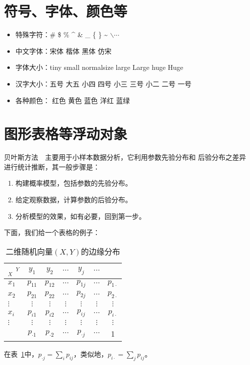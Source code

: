 \documentclass[a4paper,11pt,         %
               twoside,              %
               ]{article}
\begin{document}
\section{符号、字体、颜色等}
\begin{itemize}
  \item 特殊字符：\# \$ \% \^{} \& \_ \{ \} \~{} $\backslash \cdots$
  \item 中文字体：{\song 宋体} {\kai 楷体} {\hei 黑体} {\fs 仿宋}
  \item 字体大小：{\tiny tiny} {\small small} {\normalsize normalsize}
                  {\large large} {\Large Large} {\huge huge} {\Huge Huge}
  \item 汉字大小：{\wuhao 五号} {\dawu 大五} {\xiaosi 小四} {\sihao 四号}
                  {\xiaosan 小三} {\sanhao 三号} {\xiaoer 小二} {\erhao 二号} {\yihao 一号}
  \item 各种颜色：{\color{red} 红色} {\color{yellow} 黄色} {\color{blue} 蓝色}
                  {\color{magenta} 洋红} {\color{cyan} 蓝绿}
\end{itemize}
\section{图形表格等浮动对象}

贝叶斯方法~\cite{Gelman}~主要用于小样本数据分析，它利用参数先验分布和
后验分布之差异进行统计推断，其一般步骤是：
\begin{enumerate}
  \item 构建概率模型，包括参数的先验分布。
  \item 给定观察数据，计算参数的后验分布。
  \item 分析模型的效果，如有必要，回到第一步。
\end{enumerate}
下面，我们给一个表格的例子：
\begin{center}
\begin{table}[!h]     %
\centering
\caption{二维随机向量$(X,Y)$的边缘分布}
\begin{tabular}{l|ccccc|c}
  $_X$\hspace{3mm} $^Y$&$y_1$&$y_2$&$\cdots$&$y_j$&$\cdots$\\
\hline
$x_1$   &$p_{11}$&$p_{12}$&$\cdots$&$p_{1j}$&$\cdots$&$p_{1\cdot}$\\
$x_2$   &$p_{21}$&$p_{22}$&$\cdots$&$p_{2j}$&$\cdots$&$p_{2\cdot}$\\
$\vdots$&$\vdots$&$\vdots$&$\vdots$&$\vdots$&$\vdots$&$\vdots$ \\
$x_i$   &$p_{i1}$&$p_{i2}$&$\cdots$&$p_{ij}$&$\cdots$&$p_{i\cdot}$\\
$\vdots$&$\vdots$&$\vdots$&$\vdots$&$\vdots$&$\vdots$&$\vdots$ \\
\hline
   &$p_{\cdot 1}$&$p_{\cdot 2}$&$\cdots$&$p_{\cdot j}$&$\cdots$&1
\label{marginal distribution}
\end{tabular}
\end{table}
\end{center}
在表~\ref{marginal distribution}中，$p_{\cdot j}=\sum\limits_i p_{ij}$，类似地，$ p_{i\cdot}=\sum\limits_j p_{ij}$。
\end{document}
